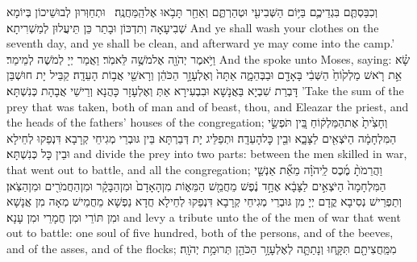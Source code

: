 {וְכִבַּסְתֶּ֧ם בִּגְדֵיכֶ֛ם בַּיּ֥וֹם הַשְּׁבִיעִ֖י וּטְהַרְתֶּ֑ם וְאַחַ֖ר תָּבֹ֥אוּ אֶל\maqqaf הַֽמַּחֲנֶֽה׃ \setuma }
{וּתְחַוְּרוּן לְבוּשֵׁיכוֹן בְּיוֹמָא שְׁבִיעָאָה וְתִדְכּוֹן וּבָתַר כֵּן תֵּיעֲלוּן לְמַשְׁרִיתָא׃}
{And ye shall wash your clothes on the seventh day, and ye shall be clean, and afterward ye may come into the camp.’}{}
{וַיֹּ֥אמֶר יְהֹוָ֖ה אֶל\maqqaf מֹשֶׁ֥ה לֵּאמֹֽר׃}
{וַאֲמַר יְיָ לְמֹשֶׁה לְמֵימַר׃}
{And the \lord\space spoke unto Moses, saying:}{}
{שָׂ֗א אֵ֣ת רֹ֤אשׁ מַלְק֙וֹחַ֙ הַשְּׁבִ֔י בָּאָדָ֖ם וּבַבְּהֵמָ֑ה אַתָּה֙ וְאֶלְעָזָ֣ר הַכֹּהֵ֔ן וְרָאשֵׁ֖י אֲב֥וֹת הָעֵדָֽה׃}
{קַבֵּיל יָת חוּשְׁבַּן דָּבְרַת שִׁבְיָא בַּאֲנָשָׁא וּבִבְעִירָא אַתְּ וְאֶלְעָזָר כָּהֲנָא וְרֵישֵׁי אֲבָהָת כְּנִשְׁתָּא׃}
{’Take the sum of the prey that was taken, both of man and of beast, thou, and Eleazar the priest, and the heads of the fathers’ houses of the congregation;}{}
{וְחָצִ֙יתָ֙ אֶת\maqqaf הַמַּלְק֔וֹחַ בֵּ֚ין תֹּפְשֵׂ֣י הַמִּלְחָמָ֔ה הַיֹּצְאִ֖ים לַצָּבָ֑א וּבֵ֖ין כׇּל\maqqaf הָעֵדָֽה׃}
{וּתְפַלֵּיג יָת דְּבַרְתָּא בֵּין גּוּבְרֵי מְגִיחֵי קְרָבָא דִּנְפַקוּ לְחֵילָא וּבֵין כָּל כְּנִשְׁתָּא׃}
{and divide the prey into two parts: between the men skilled in war, that went out to battle, and all the congregation;}{}
{וַהֲרֵמֹתָ֨ מֶ֜כֶס לַֽיהֹוָ֗ה מֵאֵ֞ת אַנְשֵׁ֤י הַמִּלְחָמָה֙ הַיֹּצְאִ֣ים לַצָּבָ֔א אֶחָ֣ד נֶ֔פֶשׁ מֵחֲמֵ֖שׁ הַמֵּא֑וֹת מִן\maqqaf הָאָדָם֙ וּמִן\maqqaf הַבָּקָ֔ר וּמִן\maqqaf הַחֲמֹרִ֖ים וּמִן\maqqaf הַצֹּֽאן׃}
{וְתַפְרֵישׁ נְסִיבָא קֳדָם יְיָ מִן גּוּבְרֵי מְגִיחֵי קְרָבָא דִּנְפַקוּ לְחֵילָא חֲדָא נַפְשָׁא מֵחֲמֵישׁ מְאָה מִן אֲנָשָׁא וּמִן תּוֹרֵי וּמִן חֲמָרֵי וּמִן עָנָא׃}
{and levy a tribute unto the \lord\space of the men of war that went out to battle: one soul of five hundred, both of the persons, and of the beeves, and of the asses, and of the flocks;}{}
{מִמַּֽחֲצִיתָ֖ם תִּקָּ֑חוּ וְנָתַתָּ֛ה לְאֶלְעָזָ֥ר הַכֹּהֵ֖ן תְּרוּמַ֥ת יְהֹוָֽה׃}

